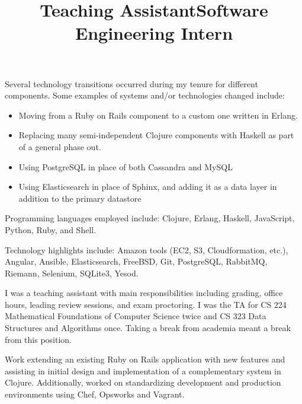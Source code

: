 \documentclass[margintitle,line]{res}
\begin{document}
\begin{resume}
\begin{position}

  Several technology transitions occurred during my tenure for different components.
  Some examples of systems and/or technologies changed include:
  \begin{itemize}
    \item{Moving from a Ruby on Rails component to a custom one written in Erlang.}
    \item{Replacing many semi-independent Clojure components with Haskell
      as part of a general phase out.}
    \item{Using PostgreSQL in place of both Cassandra and MySQL}
    \item{Using Elasticsearch in place of Sphinx, and adding it as a data layer
      in addition to the primary datastore}
  \end{itemize}

  Programming languages employed include:
  Clojure, Erlang, Haskell, JavaScript, Python, Ruby, and Shell.

  Technology highlights include: Amazon tools (EC2, S3, Cloudformation, etc.),
  Angular, Ansible, Elasticsearch, FreeBSD, Git, PostgreSQL, RabbitMQ, Riemann,
  Selenium, SQLite3, Yesod.
\end{position}

\title{Teaching Assistant}
\begin{position}
 I was a teaching assistant with main responsibilities including
 grading, office hours, leading review sessions, and exam
 proctoring. I was the TA for CS 224 Mathematical Foundations of
 Computer Science twice and CS 323 Data Structures and Algorithms
 once. Taking a break from academia meant a break from this position.
\end{position}

\title{Software Engineering Intern}
\begin{position}
 Work extending an existing Ruby on Rails application with new
 features and assisting in initial design and implementation of a
 complementary system in  Clojure. Additionally, worked on
 standardizing development and production environments using Chef,
 Opsworks and Vagrant.


\end{position}
\end{resume}
\end{document}
